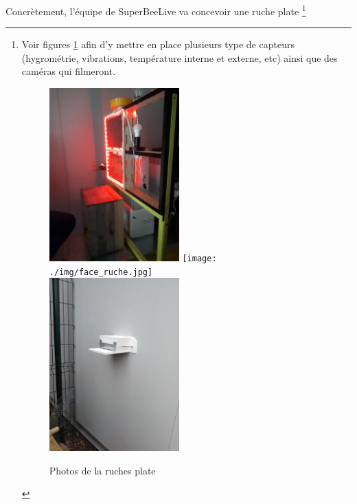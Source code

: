 \documentclass[11pt,french,a4paper]{report}
\begin{document}
Concrètement, l'équipe de SuperBeeLive va concevoir une ruche plate \footnote{Voir figures \ref{images_ruche_plate} afin d'y mettre 
en place plusieurs type  de capteurs (hygrométrie, vibrations, température interne et externe, etc) ainsi que des caméras qui filmeront.
\begin{figure}
    \centering 
    \includegraphics[width=5cm,angle=270]{./img/cote_ruche.jpg} 
    \texttt{[image: ./img/face\_ruche.jpg]} \\
    \includegraphics[width=5cm]{./img/photo_exterieur_ruche.jpg}
    \caption{Photos de la ruches plate}
    \label{images_ruche_plate}

\end{figure}

}
\end{document}
